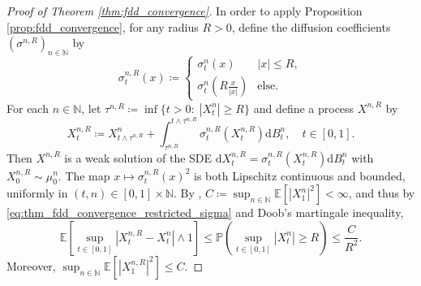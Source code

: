\documentclass[12pt,oneside]{amsart}
\theoremstyle{definition}
\newcommand{\D}{\mathrm{d}}
\newcommand{\N}{\mathbb N}
\def\E{{\mathbb E}}
\numberwithin{equation}{section}
\begin{document}
\begin{proof}[Proof of Theorem \ref{thm:fdd_convergence}]
    In order to apply Proposition \ref{prop:fdd_convergence}, for any radius $R > 0$, define the diffusion coefficients $(\sigma^{n,R})_{n \in \N}$ by
    \begin{equation}
        \sigma_t^{n,R}(x) \coloneqq
        \begin{cases}
            \sigma_t^n(x) & |x| \le R, \\
            \sigma_t^n\!\left(R \frac{x}{|x|}\right)\! & \text{else}.
        \end{cases}
    \end{equation}
    For each $n \in \N$, let $\tau^{n, R} \coloneqq \inf \{t > 0 \colon \; |X^n_t| \geq R\}$ and define a process $X^{n, R}$ by
    \begin{equation}\label{eq:thm_fdd_convergence_restricted_sigma}
    	X^{n, R}_t \coloneqq X^n_{t \wedge \tau^{n, R}} + \int_{\tau^{n, R}}^{t \wedge \tau^{n, R}}\sigma^{n, R}_t(X^{n,R}_t) \D B^n_t, \quad t \in [0, 1].
    \end{equation}
    Then $X^{n, R}$ is a weak solution of the SDE $\D X^{n, R}_t = \sigma^{n, R}_t(X^{n, R}_t) \D B^n_t$ with $X^{n, R}_0 \sim \mu^n_0$.
    The map $x \mapsto \sigma_t^{n,R}(x)^2$ is both Lipschitz continuous and bounded, uniformly in $(t,n) \in [0,1] \times \N$. By , $C \coloneqq \sup_{n \in \N} \mathbb E[|X^n_1|^2] < \infty$, and thus by \eqref{eq:thm_fdd_convergence_restricted_sigma} and Doob's martingale inequality,
    \begin{equation}
        \label{eq:thm_fdd_convergence_weak1}
        \mathbb E \!\left[ \sup_{t \in [0,1]} |X^{n,R}_t - X^n_t| \wedge 1 \right]\! \le \mathbb P \!\left( \sup_{t \in [0,1]} |X^{n}_t| \ge R \right)\! \le \frac{C}{R^2}.
    \end{equation}
    Moreover, $\sup_{n \in \N} \E[|X^{n, R}_1|^2] \leq C$.
    

\end{proof}
\end{document}
